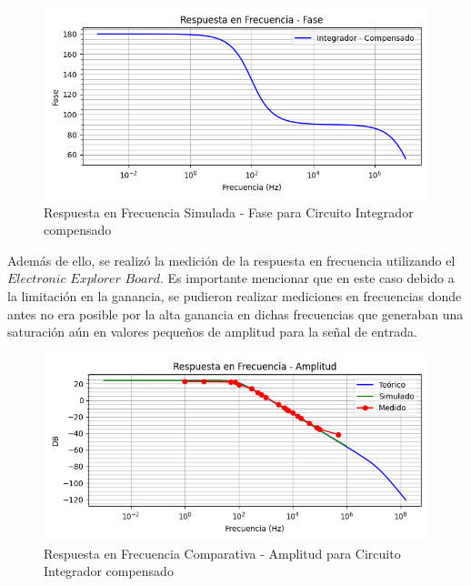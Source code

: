 \begin{figure}[H]
    \centering 
    \includegraphics [scale=0.6] {../Ejercicio3-CircuitoIntegradoresyDerivadores/Imagenes/diagrama-bode-integrador-simulado-compensado-fase.png} 
    \caption{Respuesta en Frecuencia Simulada - Fase para Circuito Integrador compensado }
    \label{fig:emptyPlotTool}
\end{figure}

Además de ello, se realizó la medición de la respuesta en frecuencia utilizando el $Electronic$ $Explorer$ $Board$. Es importante mencionar
que en este caso debido a la limitación en la ganancia, se pudieron realizar mediciones en frecuencias donde antes no era posible por la alta ganancia
en dichas frecuencias que generaban una saturación aún en valores pequeños de amplitud para la señal de entrada.

\begin{figure}[H]
    \centering 
    \includegraphics [scale=1] {../Ejercicio3-CircuitoIntegradoresyDerivadores/Imagenes/transferencia-comparativo-todo-amplitud.png} 
    \caption{Respuesta en Frecuencia Comparativa - Amplitud para Circuito Integrador compensado}
    \label{fig:emptyPlotTool}
\end{figure}

